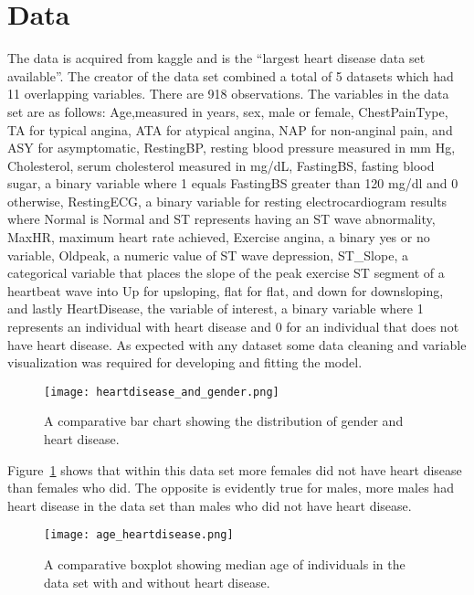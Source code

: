 \documentclass[12pt]{article}
\begin{document}


\section{Data}
\label{sec:data}

The data is acquired from kaggle and is the “largest heart disease data set available”. The creator of the data set combined a total of 5 datasets which had 11 overlapping variables. There are 918 observations. The variables in the data set are as follows: Age,measured in years, sex, male or female, ChestPainType, TA for typical angina, ATA for atypical angina, NAP for non-anginal pain, and ASY for asymptomatic, RestingBP, resting blood pressure measured in mm Hg, Cholesterol, serum cholesterol measured in mg/dL, FastingBS, fasting blood sugar, a binary variable where 1 equals FastingBS greater than 120 mg/dl and 0 otherwise, RestingECG, a binary variable for resting electrocardiogram results where Normal is Normal and ST represents having an ST wave abnormality, MaxHR, maximum heart rate achieved, Exercise angina, a binary yes or no variable, Oldpeak, a numeric value of ST wave depression, ST\_Slope, a categorical variable that places the slope of the peak exercise ST segment of a heartbeat wave into Up for upsloping, flat for flat, and down for downsloping, and lastly HeartDisease, the variable of interest, a binary variable where 1 represents an individual with heart disease and 0 for an individual that does not have heart disease. As expected with any dataset some data cleaning and variable visualization was required for developing and fitting the model. \par
\begin{figure}[tbp]
  \centering
  \texttt{[image: heartdisease\_and\_gender.png]}
  \caption{A comparative bar chart showing the distribution of gender and heart disease.}
  \label{fig:heartdisease_and_gender}
\end{figure}
Figure~\ref{fig:heartdisease_and_gender} shows that within this data set more females did not have heart disease than females who did. The opposite is evidently true for males, more males had heart disease in the data set than males who did not have heart disease. 
\begin{figure}[tbp]
  \centering
  \texttt{[image: age\_heartdisease.png]}
  \caption{A comparative boxplot showing median age of individuals in the data set with and without heart disease.}
  \label{fig:age_heartdisease}
\end{figure}
\end{document}
